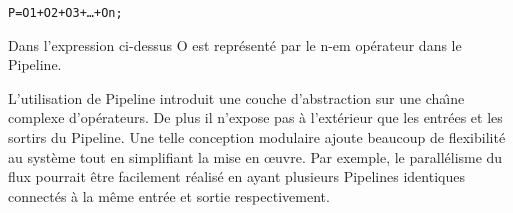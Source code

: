 {\small
\begin{alltt}
	P = O1 + O2 + O3 + … + On;
\end{alltt}
}

Dans l'expression ci-dessus O est repr\'esent\'e par le n-em op\'erateur dans le Pipeline.

L'utilisation de Pipeline introduit une couche d'abstraction sur une cha\^{\i}ne complexe d'op\'erateurs. De plus il n'expose pas à l'ext\'erieur que les entr\'ees et les sortirs du Pipeline. Une telle conception modulaire ajoute beaucoup de flexibilit\'e au syst\`eme tout en simplifiant la mise en œuvre. Par exemple, le parall\'elisme du flux pourrait \^etre facilement r\'ealis\'e en ayant plusieurs Pipelines identiques connect\'es \`a la m\^eme entr\'ee et sortie respectivement.


